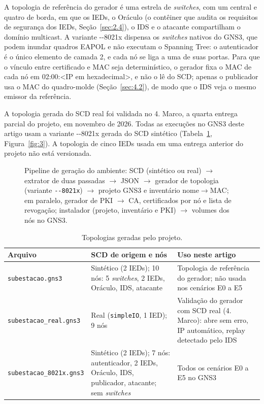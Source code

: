 \documentclass[12pt]{article}
\begin{document}
A topologia de referência do gerador é uma estrela de \emph{switches}, com um central e quatro de borda, em que os IEDs, o Oráculo (o contêiner que audita os requisitos de segurança dos IEDs, Seção~\ref{sec:2.4}), o IDS e o atacante compartilham o domínio multicast. A variante -{}-8021x dispensa os \emph{switches} nativos do GNS3, que podem inundar quadros EAPOL e não executam o Spanning Tree: o autenticador é o único elemento de camada 2, e cada nó se liga a uma de suas portas. Para que o vínculo entre certificado e MAC seja determinístico, o gerador fixa o MAC de cada nó em 02:00:<IP em hexadecimal>, e não o lê do SCD; apenas o publicador usa o MAC do quadro-molde (Seção~\ref{sec:4.2}), de modo que o IDS veja o mesmo emissor da referência.

A topologia gerada do SCD real foi validada no 4.\textordmasculine{} Marco, a quarta entrega parcial do projeto, em novembro de 2026. Todas as execuções no GNS3 deste artigo usam a variante -{}-8021x gerada do SCD sintético (Tabela~\ref{tab:8}, Figura~\ref{fig:3}). A topologia de cinco IEDs usada em uma entrega anterior do projeto não está versionada.

\begin{figure}[!t]
\centering

\caption{Pipeline de geração do ambiente: SCD (sintético ou real) \ensuremath{\rightarrow} extrator de duas passadas \ensuremath{\rightarrow} JSON \ensuremath{\rightarrow} gerador de topologia (variante \texttt{{-}{-}8021x}) \ensuremath{\rightarrow} projeto GNS3 e inventário nome\ensuremath{\rightarrow}MAC; em paralelo, gerador de PKI \ensuremath{\rightarrow} CA, certificados por nó e lista de revogação; instalador (projeto, inventário e PKI) \ensuremath{\rightarrow} volumes dos nós no GNS3.}\label{fig:2}
\end{figure}

\begin{table}[!t]
\centering
\caption{Topologias geradas pelo projeto.}\label{tab:8}
\footnotesize
\renewcommand{\arraystretch}{1.25}
\begin{tabularx}{\linewidth}{|>{\hsize=0.542\hsize\raggedright\arraybackslash}X|>{\hsize=1.229\hsize\raggedright\arraybackslash}X|>{\hsize=1.229\hsize\raggedright\arraybackslash}X|}
\hline
\textbf{Arquivo} & \textbf{SCD de origem e nós} & \textbf{Uso neste artigo} \\ \hline
\texttt{subestacao.\allowbreak{}gns3} & Sintético (2 IEDs); 10 nós: 5 \emph{switches}, 2 IEDs, Oráculo, IDS, atacante & Topologia de referência do gerador; não usada nos cenários E0 a E5 \\ \hline
\texttt{subestacao\_\allowbreak{}real.\allowbreak{}gns3} & Real (\texttt{simpleIO}, 1 IED); 9 nós & Validação do gerador com SCD real (4.\textordmasculine{} Marco): abre sem erro, IP automático, replay detectado pelo IDS \\ \hline
\texttt{subestacao\_\allowbreak{}8021x.\allowbreak{}gns3} & Sintético (2 IEDs); 7 nós: autenticador, 2 IEDs, Oráculo, IDS, publicador, atacante; sem \emph{switches} & Todos os cenários E0 a E5 no GNS3 \\ \hline
\end{tabularx}
\end{table}
\end{document}
